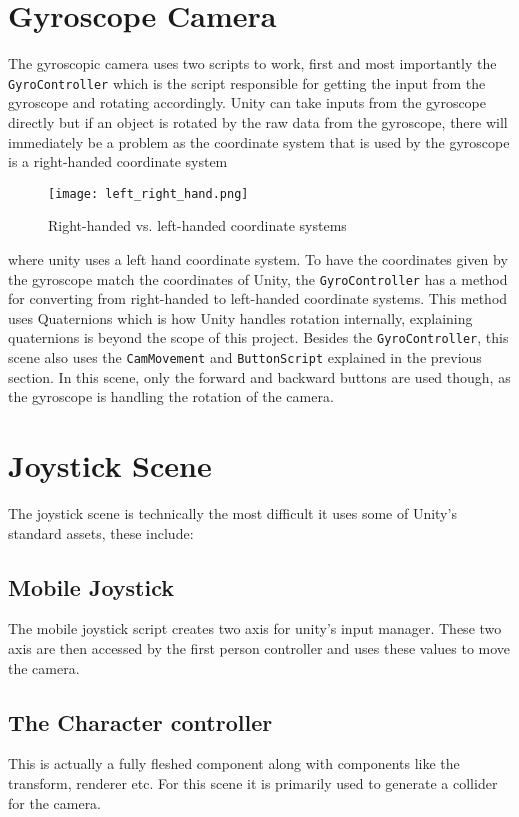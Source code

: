 \section{Gyroscope Camera}
The gyroscopic camera uses two scripts to work, first and most importantly the {\tt GyroController} which is the script responsible for getting the input from the gyroscope and rotating accordingly. Unity can take inputs from the gyroscope directly but if an object is rotated by the raw data from the gyroscope, there will immediately be a problem as the coordinate system that is used by the gyroscope is a right-handed coordinate system
 
\begin{figure}[H]
\centering
\texttt{[image: left\_right\_hand.png]}
\caption{Right-handed vs. left-handed coordinate systems}
\end{figure}

where unity uses a left hand coordinate system. To have the coordinates given by the gyroscope match the coordinates of Unity, the {\tt GyroController} has a method for converting from right-handed to left-handed coordinate systems. This method uses Quaternions which is how Unity handles rotation internally, explaining quaternions is beyond the scope of this project.\label{quaternions}
Besides the {\tt GyroController}, this scene also uses the {\tt CamMovement} and {\tt ButtonScript} explained in the previous section. In this scene, only the forward and backward buttons are used though, as the gyroscope is handling the rotation of the camera.
\section{Joystick Scene} 
The joystick scene is technically the most difficult it uses some of Unity's standard assets, these include:

\subsection*{Mobile Joystick}
The mobile joystick script creates two axis for unity's input manager. These two axis are then accessed by the first person controller and uses these values to move the camera. 
\subsection*{The Character controller}
This is actually a fully fleshed component along with components like the transform, renderer etc. For this scene it is primarily used to generate a collider for the camera. 
